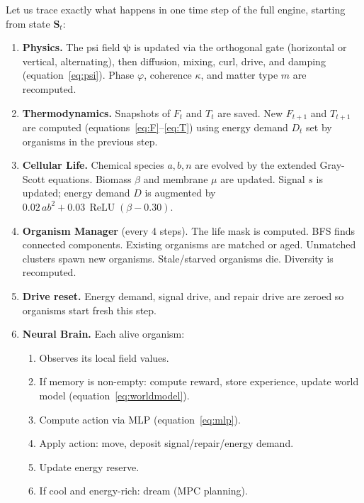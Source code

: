 \documentclass[12pt,a4paper]{article}
\newcommand{\bpsi}{\boldsymbol{\psi}}
\DeclareMathOperator{\relu}{ReLU}
\begin{document}
Let us trace exactly what happens in one time step
of the full engine, starting from state $\mathbf{S}_t$:

\begin{enumerate}

\item \textbf{Physics.}
  The psi field $\bpsi$ is updated via the
  orthogonal gate (horizontal or vertical, alternating),
  then diffusion, mixing, curl, drive, and damping
  (equation~\eqref{eq:psi}).
  Phase $\varphi$, coherence $\kappa$, and matter type $m$
  are recomputed.

\item \textbf{Thermodynamics.}
  Snapshots of $F_t$ and $T_t$ are saved.
  New $F_{t+1}$ and $T_{t+1}$ are computed
  (equations~\eqref{eq:F}--\eqref{eq:T})
  using energy demand $D_t$ set by organisms in the previous step.

\item \textbf{Cellular Life.}
  Chemical species $a, b, n$ are evolved by the extended
  Gray-Scott equations.
  Biomass $\beta$ and membrane $\mu$ are updated.
  Signal $s$ is updated; energy demand $D$ is augmented by
  $0.02\,ab^2 + 0.03\,\relu(\beta-0.30)$.

\item \textbf{Organism Manager} (every 4 steps).
  The life mask is computed.
  BFS finds connected components.
  Existing organisms are matched or aged.
  Unmatched clusters spawn new organisms.
  Stale/starved organisms die.
  Diversity is recomputed.

\item \textbf{Drive reset.}
  Energy demand, signal drive, and repair drive are zeroed
  so organisms start fresh this step.

\item \textbf{Neural Brain.}
  Each alive organism:
  \begin{enumerate}[nosep]
    \item Observes its local field values.
    \item If memory is non-empty: compute reward, store experience,
      update world model (equation~\eqref{eq:worldmodel}).
    \item Compute action via MLP (equation~\eqref{eq:mlp}).
    \item Apply action: move, deposit signal/repair/energy demand.
    \item Update energy reserve.
    \item If cool and energy-rich: dream (MPC planning).
  \end{enumerate}


\end{enumerate}
\end{document}
